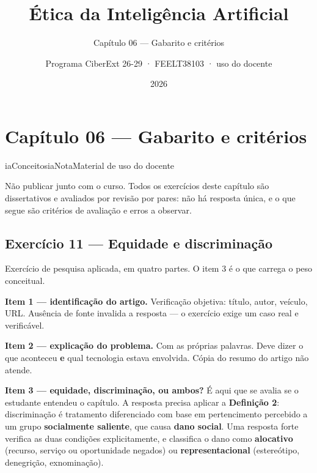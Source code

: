 \documentclass[
  11pt,
]{article}
\title{Ética da Inteligência Artificial}
\subtitle{Capítulo 06 --- Gabarito e critérios}
\author{Programa CiberExt 26-29 · FEELT38103 · uso do docente}
\date{2026}
\newenvironment{nota}[1][Nota]{\begin{iabox}{iaConceitos}{iaNota}{#1}}{\end{iabox}}
\begin{document}
\maketitle

{
\hypersetup{linkcolor=iaConceitos}
\setcounter{tocdepth}{2}
\tableofcontents
}
\hypertarget{capuxedtulo-06-gabarito-e-crituxe9rios}{%
\section{Capítulo 06 --- Gabarito e
critérios}\label{capuxedtulo-06-gabarito-e-crituxe9rios}}

\begin{nota}[Material de uso do docente]

Não publicar junto com o curso. Todos os exercícios deste capítulo são
dissertativos e avaliados por revisão por pares: não há resposta única,
e o que segue são critérios de avaliação e erros a observar.

\end{nota}

\hypertarget{exercuxedcio-11-equidade-e-discriminauxe7uxe3o}{%
\subsection{Exercício 11 --- Equidade e
discriminação}\label{exercuxedcio-11-equidade-e-discriminauxe7uxe3o}}

Exercício de pesquisa aplicada, em quatro partes. O item 3 é o que
carrega o peso conceitual.

\textbf{Item 1 --- identificação do artigo.} Verificação objetiva:
título, autor, veículo, URL. Ausência de fonte invalida a resposta --- o
exercício exige um caso real e verificável.

\textbf{Item 2 --- explicação do problema.} Com as próprias palavras.
Deve dizer o que aconteceu \textbf{e} qual tecnologia estava envolvida.
Cópia do resumo do artigo não atende.

\textbf{Item 3 --- equidade, discriminação, ou ambos?} É aqui que se
avalia se o estudante entendeu o capítulo. A resposta precisa aplicar a
\textbf{Definição 2}: discriminação é tratamento diferenciado com base
em pertencimento percebido a um grupo \textbf{socialmente saliente}, que
causa \textbf{dano social}. Uma resposta forte verifica as duas
condições explicitamente, e classifica o dano como \textbf{alocativo}
(recurso, serviço ou oportunidade negados) ou \textbf{representacional}
(estereótipo, denegrição, exnominação).
\end{document}
